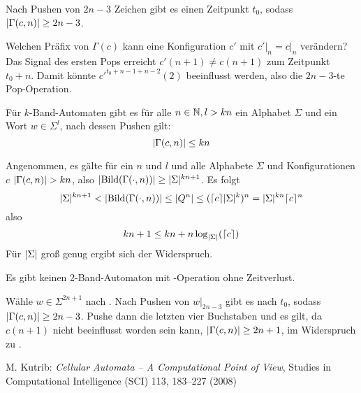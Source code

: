 \documentclass{article}
\begin{document}
\begin{satz}
    \label{thm:locontent}
    Nach Pushen von $2n-3$ Zeichen gibt es einen Zeitpunkt $t_0$, sodass $\lvert\Gamma(c,n)\rvert \geq 2n-3$.
    \begin{beweis}
        Welchen Präfix von $\Gamma(c)$ kann eine Konfiguration $c'$ mit $c' \big|_n = c \big|_n$ verändern? Das Signal des ersten Pops erreicht $c'(n+1) \neq c(n+1)$ zum Zeitpunkt $t_0+n$. Damit könnte $c'^{t_0+n-1+n-2}(2)$ beeinflusst werden, also die $2n-3$-te Pop-Operation.
    \end{beweis}
\end{satz}

\begin{satz}
    \label{cor:spacesize}
    Für $k$-Band-Automaten gibt es für alle $n \in \mathbb{N}, l > kn$ ein Alphabet $\Sigma$ und ein Wort $w \in \Sigma^l$, nach dessen Pushen gilt:
    \[ \lvert\Gamma(c,n)\rvert \leq kn \]
    \begin{beweis}
        Angenommen, es gälte für ein $n$ und $l$ und alle Alphabete $\Sigma$ und Konfigurationen $c$ $\lvert\Gamma(c,n)\rvert > kn$, also $\lvert\text{Bild}(\Gamma(\cdot,n))\rvert \geq \lvert\Sigma\rvert^{kn+1}$.
        Es folgt
        \[ \lvert\Sigma\rvert^{kn+1} < \lvert\text{Bild}(\Gamma(\cdot,n))\rvert \leq \lvert Q^n\rvert \leq (\lceil c\rceil\lvert\Sigma\rvert^k)^n = \lvert\Sigma\rvert^{kn} \lceil c\rceil^n \]
        also
        \[ kn + 1 \leq kn + n \log_{\lvert\Sigma\rvert}(\lceil c\rceil) \]
        Für $\lvert\Sigma\rvert$ groß genug ergibt sich der Widerspruch.
    \end{beweis}
\end{satz}

\begin{satz}
    Es gibt keinen 2-Band-Automaton mit \pop-Operation ohne Zeitverlust.
    \begin{beweis}
        Wähle $w \in \Sigma^{2n+1}$ nach . Nach Pushen von $w \big|_{2n-3}$ gibt es nach  $t_0$, sodass $\lvert\Gamma(c,n)\rvert \geq 2n-3$. Pushe dann die letzten vier Buchstaben und es gilt, da $c(n+1)$ nicht beeinflusst worden sein kann, $\lvert\Gamma(c,n)\rvert \geq 2n+1$, im Widerspruch zu .
    \end{beweis}
\end{satz}

\begin{thebibliography}{9}

    M. Kutrib: \emph{Cellular Automata – A Computational Point of View}, Studies in Computational Intelligence (SCI) 113, 183–227 (2008)

\end{thebibliography}
\end{document}
